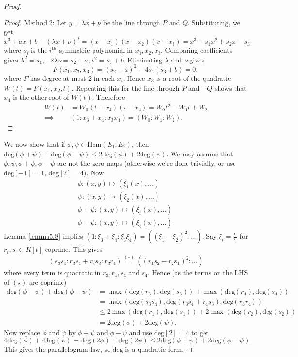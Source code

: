 \documentclass{article}
\theoremstyle{definition}
\begin{document}
\begin{proof}
\begin{proof}
        Method 2: Let $y = \lambda x + \nu$ be the line through $P$ and $Q$. Substituting, we get $x^3+ax+b -(\lambda x + \nu)^2 = (x-x_1)(x-x_2)(x-x_3) = x^3 - s_1x^2 + s_2 x - s_3$ where $s_i$ is the $i^{\text{th}}$ symmetric polynomial in $x_1,x_2,x_3$. Comparing coefficients gives $\lambda^2 = s_1,  -2\lambda \nu = s_2-a, \nu^2 = s_3+b$. Eliminating $\lambda$ and $\nu$ gives $$F(x_1,x_2,x_3) =(s_2-a)^2 - 4s_1(s_3+b) = 0,$$
        where $F$ has degree at most $2$ in each $x_i$. Hence $x_3$ is a root of the quadratic $W(t) = F(x_1,x_2,t)$. Repeating this for the line through $P$ and $-Q$ shows that $x_4$ is the other root of $W(t)$. Therefore 
        \begin{align*}
            W(t) &= W_0(t-x_3)(t-x_4) = W_0t^2 - W_1t + W_2\\
            \implies & (1:x_3+x_4:x_3x_4) = (W_0:W_1:W_2).
        \end{align*}
    \end{proof}
    We now show that if $\phi, \psi \in \text{Hom}(E_1,E_2)$, then $\text{deg}(\phi + \psi) + \text{deg}(\phi - \psi) \le 2\text{deg}(\phi) + 2\text{deg}(\psi)$. We may assume that $\phi, \psi, \phi+\psi, \phi-\psi$ are not the zero maps (otherwise we're done trivially, or use $\text{deg}[-1]=1,~\text{deg}[2]=4$). Now
    \begin{align*}
        \phi: (x,y) \mapsto (\xi_1(x), \ldots)\\
        \psi: (x,y) \mapsto (\xi_2(x), \ldots)\\
        \phi+\psi: (x,y) \mapsto (\xi_3(x), \ldots)\\
        \phi-\psi: (x,y) \mapsto (\xi_4(x), \ldots).
    \end{align*}
    Lemma \ref{lemma5.8} implies $(1:\xi_3+\xi_4: \xi_3\xi_4) = ((\xi_1-\xi_2)^2: \ldots)$. Say $\xi_i = \frac{r_i}{s_i}$ for $r_i,s_i \in K[t]$ coprime. This gives $$(s_3s_4:r_3s_4+r_4s_3:r_3r_4) \stackrel{(\star)}{=} ((r_1s_2-r_2s_1)^2 : \ldots)$$
    where every term is quadratic in $r_3,r_4,s_3$ and $s_4$. Hence (as the terms on the LHS of $(\star)$ are coprime)
    \begin{align*}
        \text{deg}(\phi+\psi) + \text{deg}(\phi-\psi) &= \max(\text{deg}(r_3),\text{deg}(s_3)) + \max(\text{deg}(r_4),\text{deg}(s_4)) \\
        &= \max(\text{deg}(s_3s_4),\text{deg}(r_3s_4+r_4s_3), \text{deg}(r_3r_4))\\
        &\le 2\max(\text{deg}(r_1),\text{deg}(s_1)) + 2\max(\text{deg}(r_2),\text{deg}(s_2))\\
        &= 2\text{deg}(\phi)+2\text{deg}(\psi).
    \end{align*}
    Now replace $\phi$ and $\psi$ by $\phi+\psi$ and $\phi-\psi$ and use $\text{deg}[2]=4$ to get \[
    4\text{deg}(\phi) + 4\text{deg}(\psi) = \text{deg}(2\phi) + \text{deg}(2\psi) \le 2\text{deg}(\phi+\psi) + 2\text{deg}(\phi-\psi).
    \]
    This gives the parallelogram law, so $\text{deg}$ is a quadratic form.
\end{proof}
\end{document}
